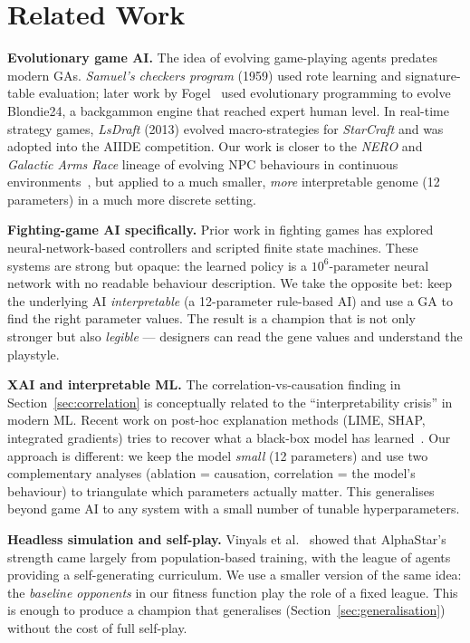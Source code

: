 \documentclass[conference]{IEEEtran}
\begin{document}
\section{Related Work}
\label{sec:related}

\textbf{Evolutionary game AI.} The idea of evolving game-playing agents predates modern GAs. \emph{Samuel's checkers program} (1959) used rote learning and signature-table evaluation; later work by Fogel~\cite{fogel2002} used evolutionary programming to evolve Blondie24, a backgammon engine that reached expert human level. In real-time strategy games, \emph{LsDraft} (2013) evolved macro-strategies for \emph{StarCraft} and was adopted into the AIIDE competition. Our work is closer to the \emph{NERO} and \emph{Galactic Arms Race} lineage of evolving NPC behaviours in continuous environments~\cite{stanley2005neroe}, but applied to a much smaller, \emph{more} interpretable genome (12 parameters) in a much more discrete setting.

\textbf{Fighting-game AI specifically.} Prior work in fighting games has explored neural-network-based controllers and scripted finite state machines. These systems are strong but opaque: the learned policy is a $10^6$-parameter neural network with no readable behaviour description. We take the opposite bet: keep the underlying AI \emph{interpretable} (a 12-parameter rule-based AI) and use a GA to find the right parameter values. The result is a champion that is not only stronger but also \emph{legible} --- designers can read the gene values and understand the playstyle.

\textbf{XAI and interpretable ML.} The correlation-vs-causation finding in Section~\ref{sec:correlation} is conceptually related to the ``interpretability crisis'' in modern ML. Recent work on post-hoc explanation methods (LIME, SHAP, integrated gradients) tries to recover what a black-box model has learned~\cite{ribeiro2016why}. Our approach is different: we keep the model \emph{small} (12 parameters) and use two complementary analyses (ablation = causation, correlation = the model's behaviour) to triangulate which parameters actually matter. This generalises beyond game AI to any system with a small number of tunable hyperparameters.

\textbf{Headless simulation and self-play.} Vinyals et al.~\cite{vinyals2019alphastar} showed that AlphaStar's strength came largely from population-based training, with the league of agents providing a self-generating curriculum. We use a smaller version of the same idea: the \emph{baseline opponents} in our fitness function play the role of a fixed league. This is enough to produce a champion that generalises (Section~\ref{sec:generalisation}) without the cost of full self-play.
\end{document}
